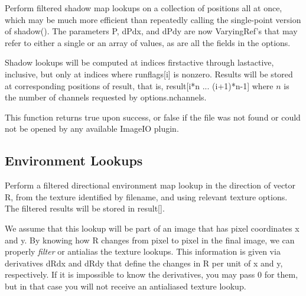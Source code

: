 Perform filtered shadow map lookups on a collection of positions all at
once, which may be much more efficient than repeatedly calling the
single-point version of {\cf shadow()}.  The parameters {\cf P},
{\cf dPdx}, and {\cf dPdy} are now
{\cf VaryingRef}'s that may refer to either a single or an array of
values, as are all the fields in the {\cf options}.

Shadow lookups will be computed at indices {\cf firstactive} through
{\cf lastactive}, inclusive, but only at indices where {\cf runflags[i]}
is nonzero.  Results will be stored at corresponding positions of
{\cf result}, that is, {\cf result[i*n ... (i+1)*n-1]} where $n$ 
is the number of channels requested by {\cf options.nchannels}.

This function returns {\cf true} upon success, or {\cf false} if the
file was not found or could not be opened by any available ImageIO
plugin.
\apiend

\newpage
\subsection{Environment Lookups}
\label{sec:texturesys:api:environment}


Perform a filtered directional environment map lookup in the direction
of vector {\cf R}, from the texture identified by {\cf filename}, and
using relevant texture {\cf options}.  The filtered results will be
stored in {\cf result[]}.

We assume that this lookup will be part of an image that has pixel
coordinates {\cf x} and {\cf y}.  By knowing how {\cf R} changes from
pixel to pixel in the final image, we can properly \emph{filter} or
antialias the texture lookups.  This information is given via
derivatives {\cf dRdx} and {\cf dRdy} that define the changes in {\cf R}
per unit of {\cf x} and {\cf y}, respectively.  If it is impossible to
know the derivatives, you may pass 0 for them, but in that case you will
not receive an antialiased texture lookup.


